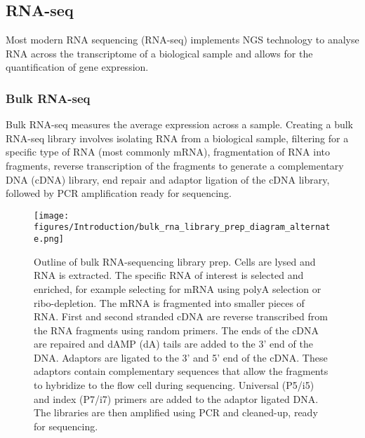 \subsection{RNA-seq}\label{subsec:rna-seq-intro}
Most modern RNA sequencing (RNA-seq) implements NGS technology to analyse RNA across the transcriptome of a biological sample and allows for the quantification of gene expression.

\subsubsection{Bulk RNA-seq}
Bulk RNA-seq measures the average expression across a sample.
Creating a bulk RNA-seq library involves isolating RNA from a biological sample, filtering for a specific type of RNA (most commonly mRNA), fragmentation of RNA into fragments, reverse transcription of the fragments to generate a complementary DNA (cDNA) library, end repair and adaptor ligation of the cDNA library, followed by PCR amplification ready for sequencing.

\begin{figure}[ht]
\centering
\texttt{[image: figures/Introduction/bulk\_rna\_library\_prep\_diagram\_alternate.png]}
\caption[Bulk RNA-seq outline]{Outline of bulk RNA-sequencing library prep.
Cells are lysed and RNA is extracted.
The specific RNA of interest is selected and enriched, for example selecting for mRNA using polyA selection or ribo-depletion.
The mRNA is fragmented into smaller pieces of RNA.
First and second stranded cDNA are reverse transcribed from the RNA fragments using random primers.
The ends of the cDNA are repaired and dAMP (dA) tails are added to the 3' end of the DNA.
Adaptors are ligated to the 3' and 5' end of the cDNA.
These adaptors contain complementary sequences that allow the fragments to hybridize to the flow cell during sequencing.
Universal (P5/i5) and index (P7/i7) primers are added to the adaptor ligated DNA.
The libraries are then amplified using PCR and cleaned-up, ready for sequencing.
}
\label{fig:bulk_diagram}\end{figure}

